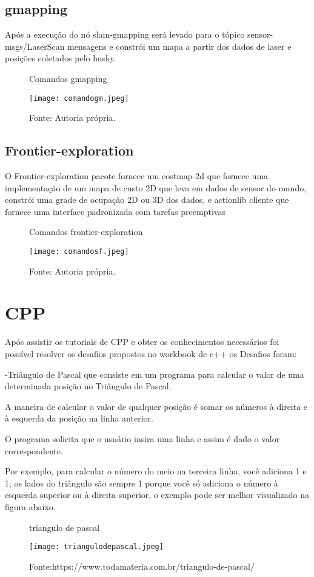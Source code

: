 \subsection{gmapping}
Após a execução do nó slam-gmapping será levado para o tópico sensor-msgs/LaserScan mensagens e constrói um mapa a partir dos dados de laser e posições coletados pelo husky.
\begin{figure} [h!]	
    \centering
    \caption{Comandos gmapping}
    \texttt{[image: comandogm.jpeg]}
    \caption*{Fonte: Autoria própria.}
    \label{fig:gmapping}
\end{figure}
\subsection{Frontier-exploration}
O Frontier-exploration pacote fornece um costmap-2d que fornece uma implementação de um mapa de custo 2D que leva em dados de sensor do mundo, constrói uma grade de ocupação 2D ou 3D dos dados, e actionlib cliente que fornece uma interface padronizada com tarefas preemptivas
\begin{figure} [h!]	
    \centering
    \caption{Comandos frontier-exploration }
    \texttt{[image: comandosf.jpeg]}
    \caption*{Fonte: Autoria própria.}
    \label{fig:frontier-exploration}
\end{figure}
\section{CPP}
Após assistir os tutoriais de CPP e obter os conhecimentos necessários foi possível resolver os desafios propostos no workbook de c++ os Desafios foram: 

    -Triângulo de Pascal que consiste em um programa para calcular o valor de uma determinada posição no Triângulo de Pascal.

    A maneira de calcular o valor de qualquer posição é somar os números à direita e à esquerda da posição na linha anterior.

   O programa solicita que o usuário insira uma linha e assim é dado o valor correspondente.

   Por exemplo, para calcular o número do meio na terceira linha, você adiciona 1 e 1; os lados do triângulo são sempre 1 porque você só adiciona o número à esquerda superior ou à direita superior, o exemplo pode ser melhor visualizado na figura abaixo.

\begin{figure} [h!]	
    \centering
    \caption{triangulo de pascal}
    \texttt{[image: triangulodepascal.jpeg]}
    \caption*{Fonte:https://www.todamateria.com.br/triangulo-de-pascal/}
    \label{fig:triangulodepascal}
\end{figure}


